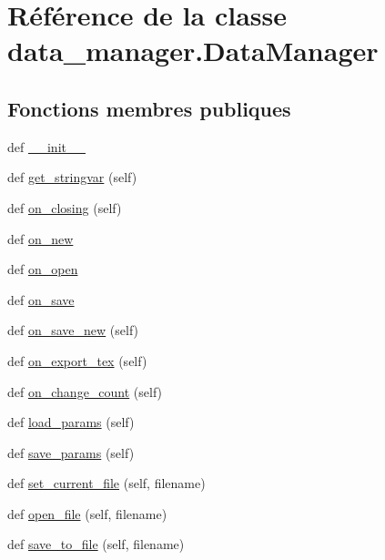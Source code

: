 \hypertarget{classdata__manager_1_1_data_manager}{}\section{Référence de la classe data\+\_\+manager.\+Data\+Manager}
\label{classdata__manager_1_1_data_manager}
\subsection*{Fonctions membres publiques}
\begin{DoxyCompactItemize}
\item 
def \hyperlink{classdata__manager_1_1_data_manager_ac366e9ff1e60bbd9f1af6f03c16786be}{\+\_\+\+\_\+init\+\_\+\+\_\+}
\item 
def \hyperlink{classdata__manager_1_1_data_manager_a0b90348fcc9ebeb7a2393765fdc75cc7}{get\+\_\+stringvar} (self)
\item 
def \hyperlink{classdata__manager_1_1_data_manager_a0e818a89edc720833d52e2fc4ccb1a31}{on\+\_\+closing} (self)
\item 
def \hyperlink{classdata__manager_1_1_data_manager_a6fde021d521f4e02dc2a4fae1e721be8}{on\+\_\+new}
\item 
def \hyperlink{classdata__manager_1_1_data_manager_a8f1069e0155969fa47d8d8e8c5da2bdd}{on\+\_\+open}
\item 
def \hyperlink{classdata__manager_1_1_data_manager_a6b949b5df5c7be9ded8b1314256df344}{on\+\_\+save}
\item 
def \hyperlink{classdata__manager_1_1_data_manager_af6bae58ad61e4562021fcd189c738589}{on\+\_\+save\+\_\+new} (self)
\item 
def \hyperlink{classdata__manager_1_1_data_manager_af9816290b2039dc26d48fc3c5990e670}{on\+\_\+export\+\_\+tex} (self)
\item 
def \hyperlink{classdata__manager_1_1_data_manager_ae4c3f0e81ad3da2ea9105576f6f2ab09}{on\+\_\+change\+\_\+count} (self)
\item 
def \hyperlink{classdata__manager_1_1_data_manager_a866ee05596fa52b5540c8db7df0034b0}{load\+\_\+params} (self)
\item 
def \hyperlink{classdata__manager_1_1_data_manager_ac3724c07fb0dba2249a906b3d9da3ba1}{save\+\_\+params} (self)
\item 
def \hyperlink{classdata__manager_1_1_data_manager_af5ad2779320a0cb48526a5b7ec2f8ace}{set\+\_\+current\+\_\+file} (self, filename)
\item 
def \hyperlink{classdata__manager_1_1_data_manager_a6d9aaaba2137be3167c4de0551c19cc1}{open\+\_\+file} (self, filename)
\item 
def \hyperlink{classdata__manager_1_1_data_manager_a18246d4222716e94d1e7fd679c10971b}{save\+\_\+to\+\_\+file} (self, filename)
\end{DoxyCompactItemize}
